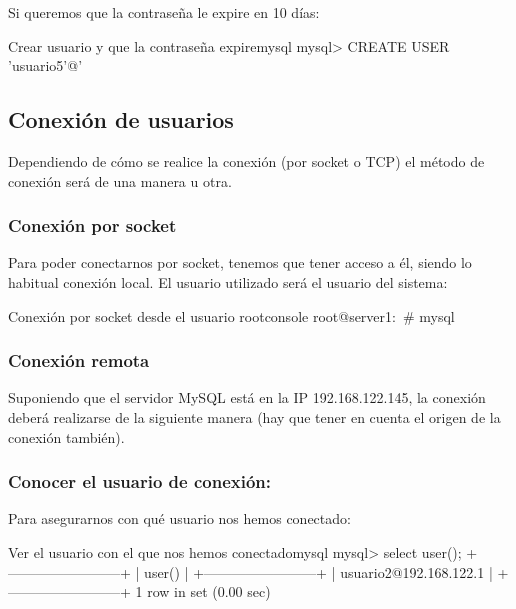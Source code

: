 Si queremos que la contraseña le expire en 10 días:

\begin{mycode}{Crear usuario y que la contraseña expire}{mysql}{{\scriptsize}}
mysql> CREATE USER 'usuario5'@'%
\end{mycode}



\subsection{Conexión de usuarios}
Dependiendo de cómo se realice la conexión (por socket o TCP) el método de conexión será de una manera u otra.


\subsubsection*{Conexión por socket}
Para poder conectarnos por socket, tenemos que tener acceso a él, siendo lo habitual conexión local. El usuario utilizado será el usuario del sistema:

\begin{mycode}{Conexión por socket desde el usuario root}{console}{}
root@server1:~# mysql
\end{mycode}


\subsubsection*{Conexión remota}
Suponiendo que el servidor MySQL está en la IP 192.168.122.145, la conexión deberá realizarse de la siguiente manera (hay que tener en cuenta el origen de la conexión también).



\subsubsection*{Conocer el usuario de conexión:}
Para asegurarnos con qué usuario nos hemos conectado:

\begin{mycode}{Ver el usuario con el que nos hemos conectado}{mysql}{}
mysql> select user();
+------------------------+
| user()                 |
+------------------------+
| usuario2@192.168.122.1 |
+------------------------+
1 row in set (0.00 sec)
\end{mycode}


